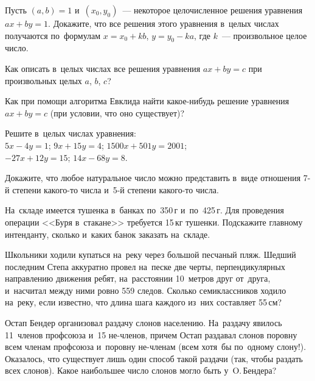 


\begin{problems}

\item
Пусть $(a, b) = 1$ и~$(x_0, y_0)$~--- некоторое целочисленное решения уравнения
$a x + b y = 1$.
Докажите, что все решения этого уравнения в~целых числах получаются по~формулам
$x = x_0 + k b$, $y = y_0 - k a$, где $k$~--- произвольное целое число.

\item
Как описать в~целых числах все решения уравнения $a x + b y = c$ при
произвольных целых $a$, $b$, $c$?

\item
Как при помощи алгоритма Евклида найти какое-нибудь решение уравнения
$a x + b y = c$ (при условии, что оно существует)?

\item
Решите в~целых числах уравнения:
\\
\subproblem $5 x - 4 y = 1$;
\qquad
\subproblem $9 x + 15 y = 4$;
\qquad
\subproblem $1500 x + 501 y = 2001$;
\\
\subproblem $-27 x + 12 y = 15$;
\qquad
\subproblem $14 x - 68 y = 8$.

\item
Докажите, что любое натуральное число можно представить в~виде отношения 7-й
степени какого-то числа и~5-й степени какого-то числа.

\item
На~складе имеется тушенка в~банках по~350\,г и~по~425\,г.
Для проведения операции <<Буря в~стакане>> требуется 15\,кг тушенки.
Подскажите главному интенданту, сколько и~каких банок заказать на~складе.

\item
Школьники ходили купаться на~реку через большой песчаный пляж.
Шедший последним Степа аккуратно провел на~песке две черты, перпендикулярных
направлению движения ребят, на~расстоянии 10~метров друг от~друга, и~насчитал
между ними ровно 559 следов.
Сколько семиклассников ходило на~реку, если известно, что длина шага каждого
из~них составляет 55\,см?

\item
Остап Бендер организовал раздачу слонов населению.
На~раздачу явилось 11~членов профсоюза и~15 не-членов, причем Остап раздавал
слонов поровну всем членам профсоюза и~поровну не-членам
(всем хотя~бы по~одному слону!).
Оказалось, что существует лишь один способ такой раздачи
(так, чтобы раздать всех слонов).
Какое наибольшее число слонов могло быть у~O.\,Бендера?


\end{problems}
